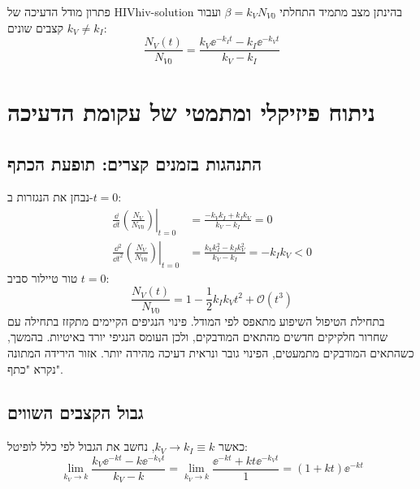 \begin{theorem}{פתרון מודל הדעיכה של HIV}{hiv-solution}
בהינתן מצב מתמיד התחלתי $\beta = k_V N_{V0}$ ועבור קצבים שונים $k_V \ne k_I$:
\begin{equation}\label{eq:hiv-main-sol}
\boxed{\frac{N_V(t)}{N_{V0}} = \frac{k_V \ee^{-k_I t} - k_I \ee^{-k_V t}}{k_V - k_I}}
\end{equation}
\end{theorem}

\section{ניתוח פיזיקלי ומתמטי של עקומת הדעיכה}\label{sec:hiv-curve-features}

\subsection{התנהגות בזמנים קצרים: תופעת הכתף}\label{sec:hiv-shoulder}
נבחן את הנגזרות ב-$t = 0$:
\begin{align}
\left.\frac{\dd}{\dd t}\left(\frac{N_V}{N_{V0}}\right)\right|_{t=0} &= \frac{-k_V k_I + k_I k_V}{k_V - k_I} = 0 \label{eq:first-derivative-zero}\\
\left.\frac{\dd^2}{\dd t^2}\left(\frac{N_V}{N_{V0}}\right)\right|_{t=0} &= \frac{k_V k_I^2 - k_I k_V^2}{k_V - k_I} = -k_I k_V < 0 \label{eq:second-derivative-negative}
\end{align}
טור טיילור סביב $t = 0$:
\begin{equation}\label{eq:hiv-taylor}
\boxed{\frac{N_V(t)}{N_{V0}} = 1 - \frac{1}{2} k_I k_V t^2 + \mathcal{O}(t^3)}
\end{equation}
בתחילת הטיפול השיפוע מתאפס לפי המודל. פינוי הנגיפים הקיימים מתקזז בתחילה עם שחרור חלקיקים חדשים מהתאים המודבקים, ולכן העומס הנגיפי יורד באיטיות. בהמשך, כשהתאים המודבקים מתמעטים, הפינוי גובר ונראית דעיכה מהירה יותר. אזור הירידה המתונה נקרא "כתף".

\subsection{גבול הקצבים השווים}\label{sec:hiv-equal-rates}
כאשר $k_V \to k_I \equiv k$, נחשב את הגבול לפי כלל לופיטל:
\begin{equation}\label{eq:lhopital-limit}
\lim_{k_V \to k} \frac{k_V \ee^{-k t} - k \ee^{-k_V t}}{k_V - k} = \lim_{k_V \to k} \frac{\ee^{-k t} + k t \ee^{-k_V t}}{1} = (1 + k t)\ee^{-k t}
\end{equation}

